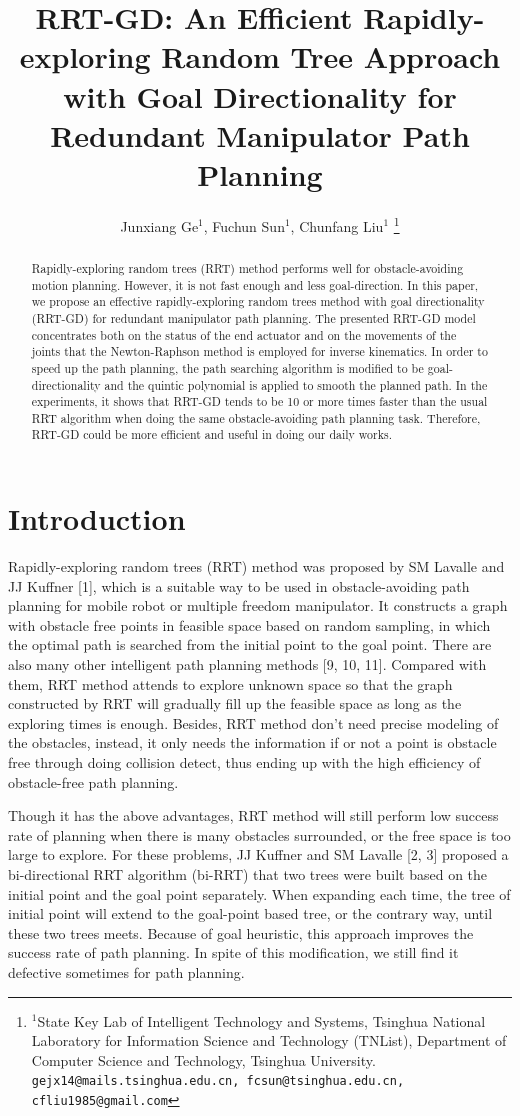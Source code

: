 \documentclass[letterpaper, 10 pt, conference]{ieeeconf}  %
\title{\LARGE \bf
RRT-GD: An Efficient Rapidly-exploring Random Tree Approach with Goal Directionality for Redundant Manipulator Path Planning
}
\author{Junxiang Ge$^{1}$, Fuchun Sun$^{1}$, Chunfang Liu$^{1}$%
\thanks{$^{1}$State Key Lab of Intelligent Technology and Systems, Tsinghua National Laboratory for Information Science and Technology (TNList), Department of Computer Science and Technology, Tsinghua University. {\tt\small gejx14@mails.tsinghua.edu.cn, fcsun@tsinghua.edu.cn, cfliu1985@gmail.com}}%
}
\begin{document}
\maketitle
\thispagestyle{empty}
\pagestyle{empty}


\begin{abstract}
Rapidly-exploring random trees (RRT) method performs well for obstacle-avoiding motion planning. However, it is not fast enough and less goal-direction. In this paper, we propose an effective rapidly-exploring random trees method with goal directionality (RRT-GD)  for redundant manipulator path planning. The presented RRT-GD model concentrates both on the status of the end actuator and on the movements of the joints that the Newton-Raphson method is employed for inverse kinematics. In order to speed up the path planning, the path searching algorithm is modified to be goal-directionality and the quintic polynomial is applied to smooth the planned path. In the experiments, it shows that RRT-GD tends to be 10 or more times faster than the usual RRT algorithm when doing the same obstacle-avoiding path planning task. Therefore, RRT-GD could be more efficient and useful in doing our daily works.
\end{abstract}


\section{Introduction}
 Rapidly-exploring random trees (RRT) method was proposed by SM Lavalle and JJ Kuffner [1], which is a suitable way to be used in obstacle-avoiding path planning for mobile robot or multiple freedom manipulator. It constructs a graph with obstacle free points in feasible space based on random sampling, in which the optimal path is searched from the initial point to the goal point. There are also many other intelligent path planning methods [9, 10, 11]. Compared with them, RRT method attends to explore unknown space so that the graph constructed by RRT will gradually fill up the feasible space as long as the exploring times is enough. Besides, RRT method don't need precise modeling of the obstacles, instead, it only needs the information if or not a point is obstacle free through doing collision detect, thus ending up with the high efficiency of obstacle-free path planning.

Though it has the above advantages, RRT method will still perform low success rate of planning when there is many obstacles surrounded, or the free space is too large to explore. For these problems, JJ Kuffner and SM Lavalle [2, 3] proposed a bi-directional RRT algorithm (bi-RRT) that two trees were built based on the initial point and the goal point separately. When expanding each time, the tree of initial point will extend to the goal-point based tree, or the contrary way, until these two trees meets. Because of goal heuristic, this approach improves the success rate of path planning. In spite of this modification, we still find it defective sometimes for path planning.
\end{document}
